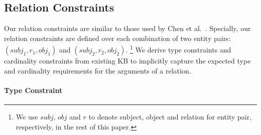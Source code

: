 

\subsection{Relation Constraints}
\label{sec:constraints}



Our relation constraints are similar to those used by  Chen et al.~.
Specially,
our relation constraints are defined over each combination of two entity pairs:$(subj_1, r_1, obj_1)$ and $(subj_2,  r_2, obj_2)$.
\footnote{We use $subj$, $obj$ and $r$ to denote subject, object and relation for entity pair, respectively, in the rest of this paper.}
We derive type constraints and cardinality constraints from existing KB to implicitly capture the expected type and cardinality requirements for the arguments of a relation.


\paragraph{Type Constraint}

